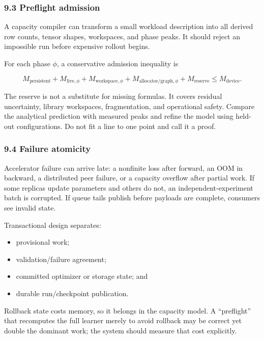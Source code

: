 \documentclass[
  10pt,
  letterpaper,
]{article}
\providecommand{\tightlist}{%
  \setlength{\itemsep}{0pt}\setlength{\parskip}{0pt}}
\begin{document}
\subsubsection{9.3 Preflight admission}\label{93-preflight-admission}

A capacity compiler can transform a small workload description into all
derived row counts, tensor shapes, workspaces, and phase peaks. It
should reject an impossible run before expensive rollout begins.

For each phase \(\phi\), a conservative admission inequality is

\[
M_{\mathrm{persistent}}
+M_{\mathrm{live},\phi}
+M_{\mathrm{workspace},\phi}
+M_{\mathrm{allocator/graph},\phi}
+M_{\mathrm{reserve}}
\leq M_{\mathrm{device}}.
\]

The reserve is not a substitute for missing formulas. It covers residual
uncertainty, library workspaces, fragmentation, and operational safety.
Compare the analytical prediction with measured peaks and refine the
model using held-out configurations. Do not fit a line to one point and
call it a proof.

\subsubsection{9.4 Failure atomicity}\label{94-failure-atomicity}

Accelerator failure can arrive late: a nonfinite loss after forward, an
OOM in backward, a distributed peer failure, or a capacity overflow
after partial work. If some replicas update parameters and others do
not, an independent-experiment batch is corrupted. If queue tails
publish before payloads are complete, consumers see invalid state.

Transactional design separates:

\begin{itemize}
\tightlist
\item
  provisional work;
\item
  validation/failure agreement;
\item
  committed optimizer or storage state; and
\item
  durable run/checkpoint publication.
\end{itemize}

Rollback state costs memory, so it belongs in the capacity model. A
``preflight'' that recomputes the full learner merely to avoid rollback
may be correct yet double the dominant work; the system should measure
that cost explicitly.
\end{document}
